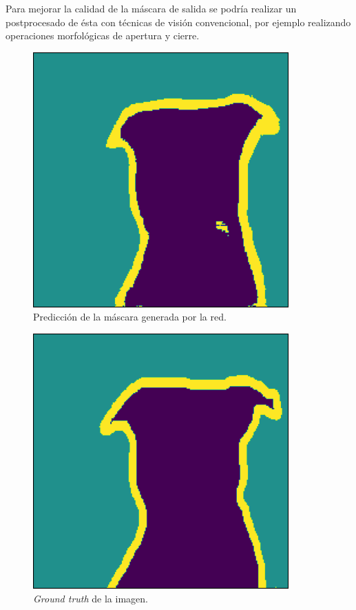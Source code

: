 \documentclass[a4paper]{article}
\newcommand\imgScale {0.6}
\begin{document}
Para mejorar la calidad de la máscara de salida se podría realizar un postprocesado de ésta con técnicas de visión convencional, por ejemplo realizando operaciones morfológicas de apertura y cierre.

\begin{figure}[hbtp]
    \centering
    \includegraphics[scale=\imgScale]{img/prediction.png}
    \caption{\small Predicci\'on de la m\'ascara generada por la red.}
    \label{fig:prediction}
\end{figure}
\begin{figure}[hbtp]
    \centering
    \includegraphics[scale=\imgScale]{img/groundTruth.png}
    \caption{\small \textit{Ground truth} de la imagen.}
    \label{fig:groundTruth}
\end{figure}
\end{document}
